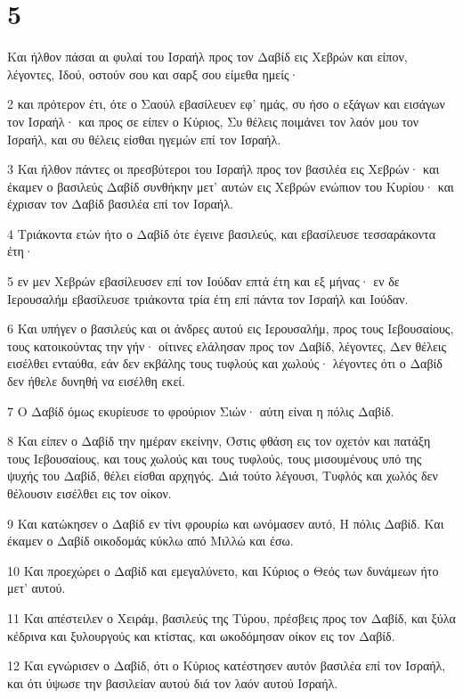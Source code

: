 \chapter{5}

\par Και ήλθον πάσαι αι φυλαί του Ισραήλ προς τον Δαβίδ εις Χεβρών και είπον, λέγοντες, Ιδού, οστούν σου και σαρξ σου είμεθα ημείς·
\par 2 και πρότερον έτι, ότε ο Σαούλ εβασίλευεν εφ' ημάς, συ ήσο ο εξάγων και εισάγων τον Ισραήλ· και προς σε είπεν ο Κύριος, Συ θέλεις ποιμάνει τον λαόν μου τον Ισραήλ, και συ θέλεις είσθαι ηγεμών επί τον Ισραήλ.
\par 3 Και ήλθον πάντες οι πρεσβύτεροι του Ισραήλ προς τον βασιλέα εις Χεβρών· και έκαμεν ο βασιλεύς Δαβίδ συνθήκην μετ' αυτών εις Χεβρών ενώπιον του Κυρίου· και έχρισαν τον Δαβίδ βασιλέα επί τον Ισραήλ.
\par 4 Τριάκοντα ετών ήτο ο Δαβίδ ότε έγεινε βασιλεύς, και εβασίλευσε τεσσαράκοντα έτη·
\par 5 εν μεν Χεβρών εβασίλευσεν επί τον Ιούδαν επτά έτη και εξ μήνας· εν δε Ιερουσαλήμ εβασίλευσε τριάκοντα τρία έτη επί πάντα τον Ισραήλ και Ιούδαν.
\par 6 Και υπήγεν ο βασιλεύς και οι άνδρες αυτού εις Ιερουσαλήμ, προς τους Ιεβουσαίους, τους κατοικούντας την γήν· οίτινες ελάλησαν προς τον Δαβίδ, λέγοντες, Δεν θέλεις εισέλθει ενταύθα, εάν δεν εκβάλης τους τυφλούς και χωλούς· λέγοντες ότι ο Δαβίδ δεν ήθελε δυνηθή να εισέλθη εκεί.
\par 7 Ο Δαβίδ όμως εκυρίευσε το φρούριον Σιών· αύτη είναι η πόλις Δαβίδ.
\par 8 Και είπεν ο Δαβίδ την ημέραν εκείνην, Όστις φθάση εις τον οχετόν και πατάξη τους Ιεβουσαίους, και τους χωλούς και τους τυφλούς, τους μισουμένους υπό της ψυχής του Δαβίδ, θέλει είσθαι αρχηγός. Διά τούτο λέγουσι, Τυφλός και χωλός δεν θέλουσιν εισέλθει εις τον οίκον.
\par 9 Και κατώκησεν ο Δαβίδ εν τίνι φρουρίω και ωνόμασεν αυτό, Η πόλις Δαβίδ. Και έκαμεν ο Δαβίδ οικοδομάς κύκλω από Μιλλώ και έσω.
\par 10 Και προεχώρει ο Δαβίδ και εμεγαλύνετο, και Κύριος ο Θεός των δυνάμεων ήτο μετ' αυτού.
\par 11 Και απέστειλεν ο Χειράμ, βασιλεύς της Τύρου, πρέσβεις προς τον Δαβίδ, και ξύλα κέδρινα και ξυλουργούς και κτίστας, και ωκοδόμησαν οίκον εις τον Δαβίδ.
\par 12 Και εγνώρισεν ο Δαβίδ, ότι ο Κύριος κατέστησεν αυτόν βασιλέα επί τον Ισραήλ, και ότι ύψωσε την βασιλείαν αυτού διά τον λαόν αυτού Ισραήλ.
